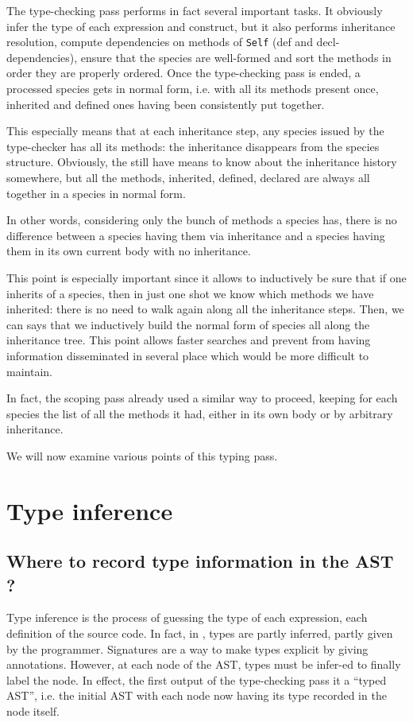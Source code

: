 
The type-checking pass performs in fact several important tasks. It
obviously infer the type of each expression and construct, but it also
performs inheritance resolution, compute dependencies on methods of
{\tt Self} (def and decl-dependencies), ensure that the species are
well-formed and sort the methods in order they are properly ordered.
Once the type-checking pass is ended, a processed species gets in
normal form, i.e. with all its methods present once, inherited and
defined ones having been consistently put together.

\label{cool-incremental-nf}
This especially means that at each inheritance step, any species
issued by the type-checker has all its methods: the inheritance
disappears from the species structure. Obviously, the still have means
to know about the inheritance history somewhere, but all the methods,
inherited, defined, declared are always all together in a species in
normal form.

In other words, considering only the bunch of methods a species has,
there is no difference between a species having them via inheritance
and a species having them in its own current body with no
inheritance.

This point is especially important since it allows to inductively be
sure that if one inherits of a species, then in just one shot we know
which methods we have inherited: there is no need to walk again along
all the inheritance steps. Then, we can says that we inductively build
the normal form of species all along the inheritance tree. This point
allows faster searches and prevent from having information
disseminated in several place which would be more difficult to
maintain.

In fact, the scoping pass already used a similar way to proceed,
keeping for each species the list of all the methods it had, either in
its own body or by arbitrary inheritance.

\medskip
We will now examine various points of this typing pass.




\section{Type inference}
\subsection{Where to record type information in the AST ?}
Type inference is the process of guessing the type of each expression,
each definition of the source code. In fact, in \focalize, types are
partly inferred, partly given by the programmer. Signatures are a way
to make types explicit by giving annotations. However, at each node of
the AST, types must be infer-ed to finally label the node. In effect,
the first output of the type-checking pass it a ``typed AST'',
i.e. the initial AST with each node now having its type recorded in
the node itself.

